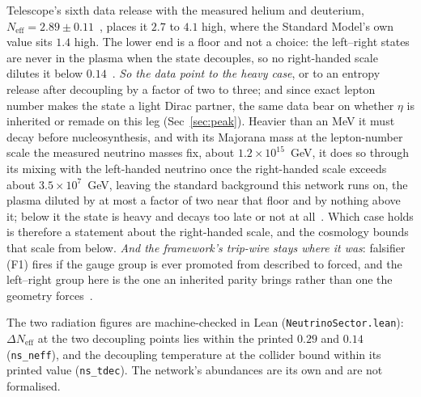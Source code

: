 \documentclass[11pt,a4paper]{article}
\theoremstyle{plain}
\theoremstyle{definition}
\theoremstyle{remark}
\begin{document}
Telescope's sixth data release with the measured helium and deuterium, $N_{\mathrm{eff}}=2.89\pm0.11$~\cite{ACTDR6ext}, places it $2.7$ to $4.1$ high, where the Standard Model's own value sits $1.4$ high. The lower end is a floor and not a choice: the left--right states are never in the plasma when the state decouples, so no right-handed scale dilutes it below $0.14$~\cite{JanzenCRcosmology}. \emph{So the data point to the heavy case}, or to an entropy release after decoupling by a factor of two to three; and since exact lepton number makes the state a light Dirac partner, the same data bear on whether $\eta$ is inherited or remade on this leg (Sec~\ref{sec:peak}). Heavier than an MeV it must decay before nucleosynthesis, and with its Majorana mass at the lepton-number scale the measured neutrino masses fix, about $1.2\times10^{15}$~GeV, it does so through its mixing with the left-handed neutrino once the right-handed scale exceeds about $3.5\times10^{7}$~GeV, leaving the standard background this network runs on, the plasma diluted by at most a factor of two near that floor and by nothing above it; below it the state is heavy and decays too late or not at all~\cite{JanzenCRcosmology}. Which case holds is therefore a statement about the right-handed scale, and the cosmology bounds that scale from below. \emph{And the framework's trip-wire stays where it was}: falsifier \textup{(F1)} fires if the gauge group is ever promoted from described to forced, and the left--right group here is the one an inherited parity brings rather than one the geometry forces~\cite{JanzenCRframework}.

The two radiation figures are machine-checked in Lean (\texttt{NeutrinoSector.lean}): $\Delta N_{\mathrm{eff}}$ at the two decoupling points lies within the printed $0.29$ and $0.14$ (\texttt{ns\_neff}), and the decoupling temperature at the collider bound within its printed value (\texttt{ns\_tdec}). The network's abundances are its own and are not formalised.
\end{document}
